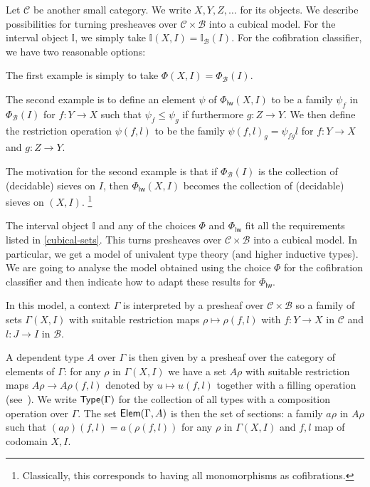 \documentclass[10pt,a4paper,draft]{article}
\def\Type{\hbox{\sf Type}}
\newcommand{\II}{\mathbb{I}}
\newcommand{\Elem}{{\sf Elem}}
\newcommand{\CC}{{\mathcal C}}
\newcommand{\id}{\mathsf{id}}
\newcommand{\BB}{\mathcal{B}}
\renewcommand{\~}{\widetilde}
\newcommand{\levelwise}{\mathsf{lw}}
\newcommand{\cofuniv}{\Phi}
\newcommand{\cofunivLW}{\Phi_{\levelwise}}
\newcommand{\cofunivConst}{\Phi}
\theoremstyle{definition}
\theoremstyle{remark} %
\begin{document}
Let $\CC$ be another small category.
We write $X,Y,Z,\dots$ for its objects.
We describe possibilities for turning presheaves over $\CC \times \BB$ into a cubical model.
For the interval object $\II$, we simply take $\II(X,I) = \II_{\BB}(I)$.
For the cofibration classifier, we have two reasonable options:
\begin{options}
\item
The first example is simply to take $\cofunivConst(X,I) = \cofuniv_{\BB}(I)$.
\item
The second example is to define an element $\psi$ of $\cofunivLW(X,I)$ to be
a family $\psi_f$ in $\cofuniv_{\BB}(I)$ for $f \colon Y\rightarrow X$ such that
$\psi_f\leqslant \psi_g$ if furthermore $g \colon Z\rightarrow Y$.
We then define the restriction operation $\psi (f,l)$ to be the family
$\psi(f,l)_g = \psi_{f g} l$ for $f \colon Y\rightarrow X$ and $g \colon Z\rightarrow Y$.
\end{options}
The motivation for the second example is that if
$\cofuniv_{\BB}(I)$ is the collection of (decidable) sieves on $I$, then
$\cofunivLW(X,I)$ becomes the collection of (decidable) sieves on $(X,I)$.%
\footnote{Classically, this corresponds to having all monomorphisms as cofibrations.}

The interval object $\II$ and any of the choices $\cofunivConst$ and $\cofunivLW$ fit all the requirements listed in \cref{cubical-sets}.
This turns presheaves over $\CC \times \BB$ into a cubical model.
In particular, we get a model of univalent type theory (and higher inductive types).
We are going to analyse the model obtained using the choice $\cofunivConst$ for the cofibration classifier and then indicate how to adapt these results for $\cofunivLW$.

\medskip

In this model, a context $\Gamma$ is interpreted by a presheaf
over $\CC\times\BB$ so a family of sets $\Gamma(X,I)$ with suitable
restriction maps $\rho\mapsto \rho(f,l)$ with $f:Y\rightarrow X$ in $\CC$ and
$l:J\rightarrow I$ in $\BB$.

A dependent type $A$ over $\Gamma$ is then given by a presheaf over the category
of elements of $\Gamma$: for any $\rho$ in $\Gamma(X,I)$ we have a set
$A\rho$ with suitable restriction maps $A\rho \rightarrow A\rho(f,l)$ denoted by $u\mapsto u(f,l)$
together with a filling operation (see~\cite{CCHM15,OrtonP16}).
We write $\Type(\Gamma)$ for the collection of all types with a composition operation
over $\Gamma$.
The set $\Elem(\Gamma,A)$ is then the set of sections: a family $a\rho$
in $A\rho$ such that $(a\rho)(f,l) = a(\rho(f,l))$ for any $\rho$
in $\Gamma(X,I)$ and $f,l$ map of codomain $X,I$.
\end{document}
